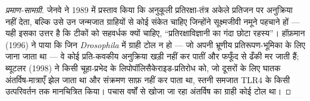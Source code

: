 \begin{proof}[प्रमाण-सामग्री]
जेनवे ने 1989 में प्रस्ताव किया कि अनुकूली प्रतिरक्षा-तंत्र अकेले
प्रतिजन पर अनुक्रिया नहीं देता, बल्कि उसे उन जन्मजात ग्राहियों से कोई
संकेत चाहिए जिन्होंने सूक्ष्मजीवी नमूने पहचाने हों --- यही इसका उत्तर
है कि टीकों को सहवर्धक क्यों चाहिए, ``प्रतिरक्षाविज्ञानी का गंदा छोटा
रहस्य''। हॉफ़मान (1996) ने पाया कि जिन \emph{Drosophila} में ग्राही
टोल न हो --- जो अपनी भ्रूणीय प्रतिरूपण-भूमिका के लिए जाना जाता था ---
वे कोई प्रति-कवकीय अनुक्रिया खड़ी नहीं कर पातीं और फफूँद से ढँकी मर
जाती हैं; ब्यूटलर (1998) ने किसी चूहा-प्रभेद के
लिपोपॉलिसैकेराइड-प्रतिरोध को, जो दूसरों के लिए घातक अंतर्विष-मात्राएँ
झेल जाता था और  संक्रमण साफ़ नहीं कर पाता था, स्तनी समजात
TLR4 के किसी उत्परिवर्तन तक मानचित्रित किया। पचास वर्षों से खोजा जा रहा
अंतर्विष का ग्राही कोई टोल था।
\end{proof}

